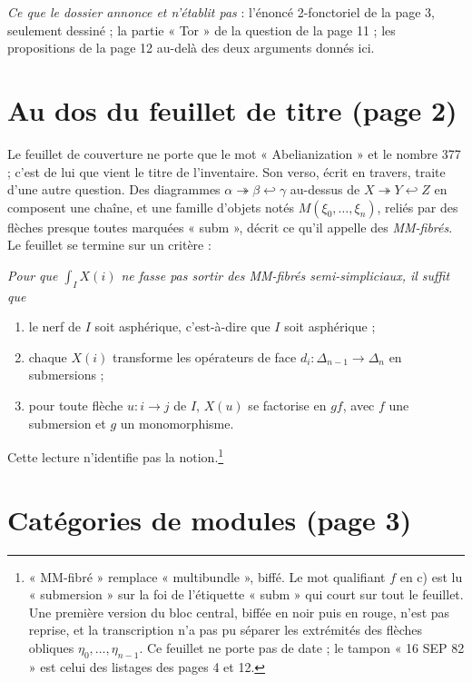 \documentclass[11pt,a4paper]{article}
\begin{document}
\emph{Ce que le dossier annonce et n'établit pas} : l'énoncé 2-fonctoriel de la
page 3, seulement dessiné ; la partie « Tor » de la question de la page 11 ; les
propositions de la page 12 au-delà des deux arguments donnés ici.

\section*{Au dos du feuillet de titre (page 2)}

Le feuillet de couverture ne porte que le mot « Abelianization » et le nombre
377 ; c'est de lui que vient le titre de l'inventaire. Son verso, écrit en
travers, traite d'une autre question. Des diagrammes
$\alpha \twoheadrightarrow \beta \hookleftarrow \gamma$ au-dessus de
$X \twoheadrightarrow Y \hookleftarrow Z$ en composent une chaîne, et une
famille d'objets notés $M(\xi_{0}, \ldots, \xi_{n})$, reliés par des flèches
presque toutes marquées « subm », décrit ce qu'il appelle des
\emph{MM-fibrés}. Le feuillet se termine sur un critère :

\emph{Pour que $\int_{I} X(i)$ ne fasse pas sortir des MM-fibrés
semi-simpliciaux, il suffit que}
\begin{enumerate}
\item[a)] le nerf de $I$ soit asphérique, c'est-à-dire que $I$ soit asphérique ;
\item[b)] chaque $X(i)$ transforme les opérateurs de face $d_{i} : \Delta_{n-1}
\to \Delta_{n}$ en submersions ;
\item[c)] pour toute flèche $u : i \to j$ de $I$, $X(u)$ se factorise en
$g f$, avec $f$ une submersion et $g$ un monomorphisme.
\end{enumerate}

Cette lecture n'identifie pas la notion.\footnote{« MM-fibré »
remplace « multibundle », biffé. Le mot qualifiant $f$ en c) est lu
« submersion » sur la foi de l'étiquette « subm » qui court sur tout le
feuillet. Une première version du bloc central, biffée en noir puis en rouge,
n'est pas reprise, et la transcription n'a pas pu séparer les extrémités des
flèches obliques $\eta_{0}, \ldots, \eta_{n-1}$. Ce feuillet ne porte pas de
date ; le tampon « 16 SEP 82 » est celui des listages des pages 4 et 12.}

\section*{Catégories de modules (page 3)}
\end{document}

